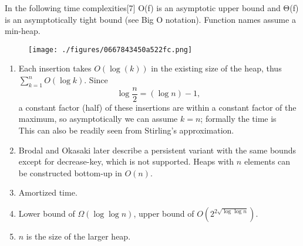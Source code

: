 In the following time complexities[7] O(f) is an asymptotic upper bound and Θ(f) is an asymptotically tight bound (see Big O notation). Function names assume a min-heap.
\begin{figure}[ht]
\centering
\texttt{[image: ./figures/0667843450a522fc.png]}
\caption\label{fig_DUI_2}
\end{figure}
\begin{enumerate}
    \item Each insertion takes $O(\log(k))$ in the existing size of the heap, thus $\sum_{k=1}^n O(\log k)$. Since 
   $$\log \frac{n}{2} = (\log n) - 1,~$$
    a constant factor (half) of these insertions are within a constant factor of the maximum, so asymptotically we can assume $k = n$; formally the time is 
    \\[    n O(\log n) - O(n) = O(n \log n).    \\]
    This can also be readily seen from Stirling's approximation.
    
    \item Brodal and Okasaki later describe a persistent variant with the same bounds except for decrease-key, which is not supported. Heaps with $n$ elements can be constructed bottom-up in $O(n)$.
    
    \item Amortized time.
    
    \item Lower bound of $\Omega(\log \log n)$, upper bound of $O(2^{2\sqrt{\log \log n}})$.
    
    \item $n$ is the size of the larger heap.
\end{enumerate}